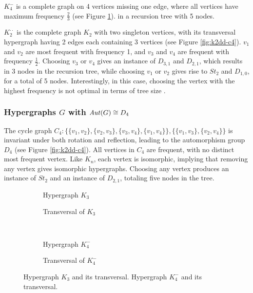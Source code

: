 $K_4^-$ is a complete graph on 4 vertices missing one edge, where all vertices have maximum frequency $\frac{2}{3}$ (see Figure \ref{fig:k3-k4minus}).    in a recursion tree with 5 nodes.

$K_2^{\cdot\cdot}$ is the complete graph $K_2$ with two singleton vertices, with its transversal hypergraph having 2 edges each containing 3 vertices (see Figure \ref{fig:k2dd-c4}). $v_1$ and $v_2$ are most frequent with frequency 1, and $v_3$ and $v_4$ are frequent with frequency $\frac{1}{2}$. Choosing $v_3$ or $v_4$ gives an instance of $D_{3,1}$ and $D_{2,1}$, which results in 3 nodes in the recursion tree, while choosing $v_1$ or $v_2$ gives rise to $St_2$ and $D_{1,0}$, for a total of 5 nodes. Interestingly, in this case, choosing the vertex with the highest frequency is not optimal in terms of tree size .

\subsubsection*{Hypergraphs $G$ with $\mathit{Aut}(G)\cong D_4$}

The cycle graph $C_4:\{\{v_1,v_2\},\{v_2,v_3\},\{v_3,v_4\},\{v_1,v_4\}\},\{\{v_1,v_3\},\{v_2,v_4\}\}$  is invariant under both rotation and reflection, leading to the automorphism group $D_4$ (see Figure \ref{fig:k2dd-c4}). All vertices in $C_4$ are frequent, with no distinct most frequent vertex. Like $K_n$, each vertex is isomorphic, implying that removing any vertex gives isomorphic hypergraphs. Choosing any vertex produces an instance of $St_2$ and an instance of $D_{2,1}$, totaling five nodes in the tree.

\begin{figure}[tp]
\centering
\begin{subfigure}{0.45\linewidth}\centering\caption{Hypergraph $K_3$}\end{subfigure}\hfill
\begin{subfigure}{0.45\linewidth}\centering\caption{Transversal of $K_3$}\end{subfigure}\\[8pt]
\begin{subfigure}{0.45\linewidth}\centering\caption{Hypergraph $K_4^-$}\end{subfigure}\hfill
\begin{subfigure}{0.45\linewidth}\centering\caption{Transversal of $K_4^-$}\end{subfigure}
\caption{Hypergraph $K_3$ and its transversal. Hypergraph $K_4^-$ and its transversal.}\label{fig:k3-k4minus}
\end{figure}

